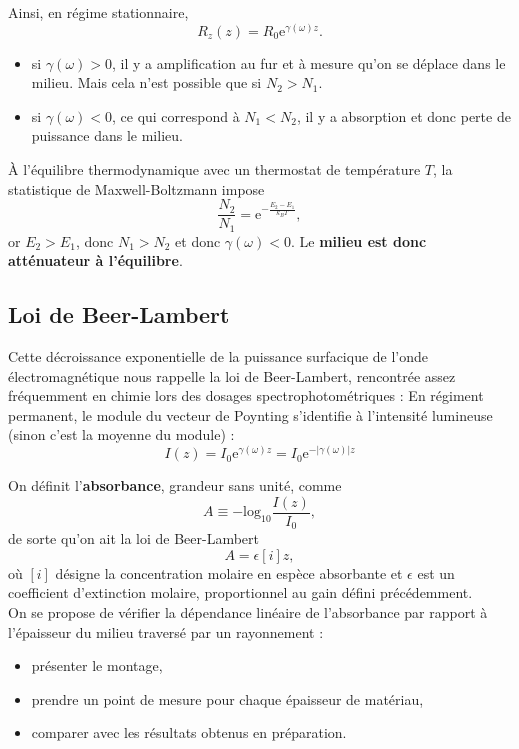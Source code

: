 \documentclass[11pt,a4paper]{report}
\begin{document}
Ainsi, en régime stationnaire,
\begin{equation}
	\boxed{R_z(z) = R_0 \text{e}^{\gamma(\omega)z}}.
\end{equation}
\begin{itemize}
	\item si $\gamma(\omega) > 0$, il y a amplification au fur et à mesure qu'on se déplace dans le 			milieu. Mais cela n'est possible que si $N_2 > N_1$.
	\item si $\gamma(\omega) < 0$, ce qui correspond à $N_1 < N_2$, il y a absorption et donc perte de 			puissance dans le milieu.
\end{itemize}

\`A l'équilibre thermodynamique avec un thermostat de température $T$, la statistique de Maxwell-Boltzmann impose
\begin{equation}
	\frac{N_2}{N_1} = \text{e}^{-\frac{E_2 - E_1}{k_B T}},
\end{equation}
or $E_2 > E_1$, donc $N_1 > N_2$ et donc $\gamma(\omega) < 0$. Le \textbf{milieu est donc atténuateur à l'équilibre}.

\newpage
\subsection{Loi de Beer-Lambert}

Cette décroissance exponentielle de la puissance surfacique de l'onde électromagnétique nous rappelle la loi de Beer-Lambert, rencontrée assez fréquemment en chimie lors des dosages spectrophotométriques : En régiment permanent, le module du vecteur de Poynting s'identifie à l'intensité lumineuse (sinon c'est la moyenne du module) :
\begin{equation}
	I(z) = I_0 \text{e}^{\gamma(\omega)z} = I_0 \text{e}^{-|\gamma(\omega)|z}
\end{equation}

On définit l'\textbf{absorbance}, grandeur sans unité, comme
\begin{equation}
	A \equiv -\text{log}_{10}\frac{I(z)}{I_0}, 
\end{equation}
de sorte qu'on ait la loi de Beer-Lambert
\begin{equation}
	A = \epsilon [i] z,
\end{equation}
où $[i]$ désigne la concentration molaire en espèce absorbante et $\epsilon$ est un coefficient d'extinction molaire, proportionnel au gain défini précédemment.\\

On se propose de vérifier la dépendance linéaire de l'absorbance par rapport à l'épaisseur du milieu traversé par un rayonnement :
\begin{itemize}
	\item présenter le montage,
	\item prendre un point de mesure pour chaque épaisseur de matériau,
	\item comparer avec les résultats obtenus en préparation.
\end{itemize}
\end{document}
